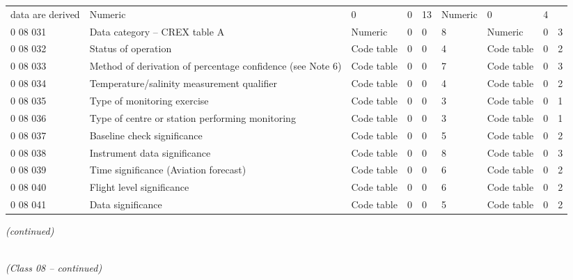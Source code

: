 \begin{longtable}[]{@{}lllllllll@{}}
\begin{minipage}[t]{0.08\columnwidth}
data are derived\strut
\end{minipage} & \begin{minipage}[t]{0.08\columnwidth}\raggedright
Numeric\strut
\end{minipage} & \begin{minipage}[t]{0.08\columnwidth}\raggedright
0\strut
\end{minipage} & \begin{minipage}[t]{0.08\columnwidth}\raggedright
0\strut
\end{minipage} & \begin{minipage}[t]{0.08\columnwidth}\raggedright
13\strut
\end{minipage} & \begin{minipage}[t]{0.08\columnwidth}\raggedright
Numeric\strut
\end{minipage} & \begin{minipage}[t]{0.08\columnwidth}\raggedright
0\strut
\end{minipage} & \begin{minipage}[t]{0.08\columnwidth}\raggedright
4\strut
\end{minipage}\tabularnewline
0 08 031 & Data category -- CREX table A & Numeric & 0 & 0 & 8 & Numeric & 0 & 3\tabularnewline
0 08 032 & Status of operation & Code table & 0 & 0 & 4 & Code table & 0 & 2\tabularnewline
0 08 033 & Method of derivation of percentage confidence (see Note 6) & Code table & 0 & 0 & 7 & Code table & 0 & 3\tabularnewline
0 08 034 & Temperature/salinity measurement qualifier & Code table & 0 & 0 & 4 & Code table & 0 & 2\tabularnewline
0 08 035 & Type of monitoring exercise & Code table & 0 & 0 & 3 & Code table & 0 & 1\tabularnewline
0 08 036 & Type of centre or station performing monitoring & Code table & 0 & 0 & 3 & Code table & 0 & 1\tabularnewline
0 08 037 & Baseline check significance & Code table & 0 & 0 & 5 & Code table & 0 & 2\tabularnewline
0 08 038 & Instrument data significance & Code table & 0 & 0 & 8 & Code table & 0 & 3\tabularnewline
0 08 039 & Time significance (Aviation forecast) & Code table & 0 & 0 & 6 & Code table & 0 & 2\tabularnewline
0 08 040 & Flight level significance & Code table & 0 & 0 & 6 & Code table & 0 & 2\tabularnewline
0 08 041 & Data significance & Code table & 0 & 0 & 5 & Code table & 0 & 2\tabularnewline
\bottomrule
\end{longtable}

\emph{(continued)}

\emph{\\
(Class 08 -- continued)}

